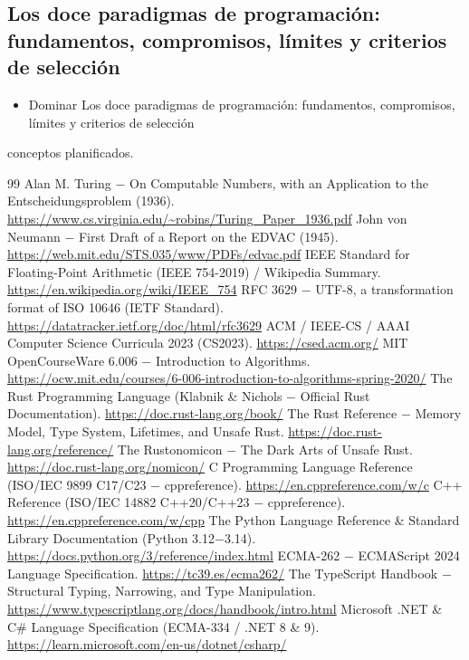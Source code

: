 \documentclass{book}
\begin{document}
\subsection*{\checkmark Los doce paradigmas de programación: fundamentos, compromisos, límites y criterios de selección}
\begin{itemize}
\item Dominar Los doce paradigmas de programación: fundamentos, compromisos, límites y criterios de selección
\end{itemize}
 conceptos planificados.
\backmatter
\begin{thebibliography}{99}
 Alan M. Turing \(-\) On Computable Numbers, with an Application to the Entscheidungsproblem (1936). \url{https://www.cs.virginia.edu/~robins/Turing_Paper_1936.pdf}
 John von Neumann \(-\) First Draft of a Report on the EDVAC (1945). \url{https://web.mit.edu/STS.035/www/PDFs/edvac.pdf}
 IEEE Standard for Floating-Point Arithmetic (IEEE 754-2019) / Wikipedia Summary. \url{https://en.wikipedia.org/wiki/IEEE_754}
 RFC 3629 \(-\) UTF-8, a transformation format of ISO 10646 (IETF Standard). \url{https://datatracker.ietf.org/doc/html/rfc3629}
 ACM / IEEE-CS / AAAI Computer Science Curricula 2023 (CS2023). \url{https://csed.acm.org/}
 MIT OpenCourseWare 6.006 \(-\) Introduction to Algorithms. \url{https://ocw.mit.edu/courses/6-006-introduction-to-algorithms-spring-2020/}
 The Rust Programming Language (Klabnik \& Nichols \(-\) Official Rust Documentation). \url{https://doc.rust-lang.org/book/}
 The Rust Reference \(-\) Memory Model, Type System, Lifetimes, and Unsafe Rust. \url{https://doc.rust-lang.org/reference/}
 The Rustonomicon \(-\) The Dark Arts of Unsafe Rust. \url{https://doc.rust-lang.org/nomicon/}
 C Programming Language Reference (ISO/IEC 9899 C17/C23 \(-\) cppreference). \url{https://en.cppreference.com/w/c}
 C++ Reference (ISO/IEC 14882 C++20/C++23 \(-\) cppreference). \url{https://en.cppreference.com/w/cpp}
 The Python Language Reference \& Standard Library Documentation (Python 3.12\(-\)3.14). \url{https://docs.python.org/3/reference/index.html}
 ECMA-262 \(-\) ECMAScript 2024 Language Specification. \url{https://tc39.es/ecma262/}
 The TypeScript Handbook \(-\) Structural Typing, Narrowing, and Type Manipulation. \url{https://www.typescriptlang.org/docs/handbook/intro.html}
 Microsoft .NET \& C\# Language Specification (ECMA-334 / .NET 8 \& 9). \url{https://learn.microsoft.com/en-us/dotnet/csharp/}

\end{thebibliography}
\end{document}
